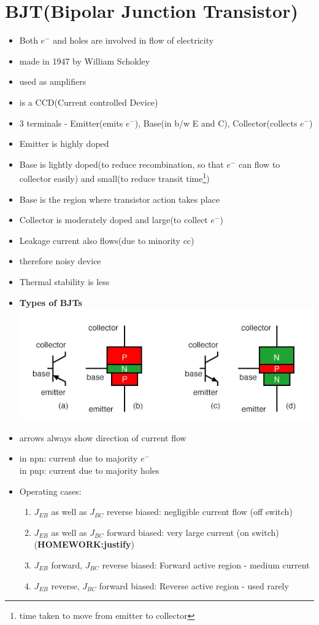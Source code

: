 \documentclass[10pt, a4paper]{report}
\begin{document}
	\section{BJT(Bipolar Junction Transistor)}
		\begin{itemize}
			\item Both $ e^- $ and holes are involved in flow of electricity
			\item made in 1947 by William Schokley
			\item used as amplifiers
			\item is a CCD(Current controlled Device)
			\item 3 terminals - Emitter(emits $ e^- $), Base(in b/w E and C), Collector(collects $ e^- $)
			\item Emitter is highly doped
			\item Base is lightly doped(to reduce recombination, so that $ e^- $ can flow to collector easily) and small(to reduce transit time\footnote{time taken to move from emitter to collector})
			\item Base is the region where transistor action takes place
			\item Collector is moderately doped and large(to collect $ e^- $)
			\item Leakage current also flows(due to minority cc)
			\item therefore noisy device
			\item Thermal stability is less
			\item \textbf{Types of BJTs} \\
				\includegraphics[width=0.9\linewidth]{img/bjt types}
			\item arrows always show direction of current flow
			\item in npn: current due to majority $ e^- $ \\in pnp: current due to majority holes
			\item Operating cases: \\
				\begin{enumerate}
					\item $ J_{EB} $ as well as $ J_{BC} $ reverse biased: negligible current flow (off switch)
					\item $ J_{EB} $ as well as $ J_{BC} $ forward biased: very large current (on switch)(\textbf{HOMEWORK:justify})
					\item $ J_{EB} $ forward, $ J_{BC} $ reverse biased: Forward active region - medium current
					\item $ J_{EB} $ reverse, $ J_{BC} $ forward biased: Reverse active region - used rarely
				\end{enumerate}
		\end{itemize}
\end{document}
